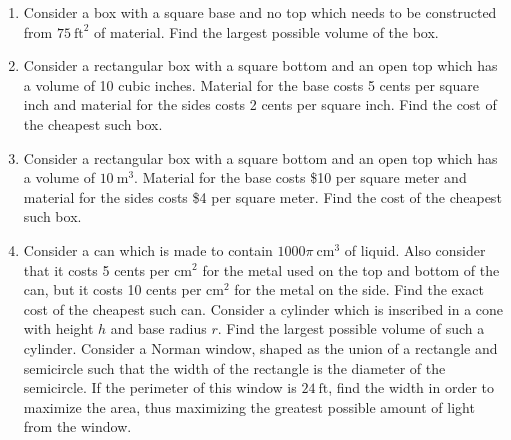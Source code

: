 \documentclass{book}
\begin{document}
\begin{enumerate}[!HW!]
\itemspade Consider an open box with a square base and a volume of $4000\ \text{cm}^3$. Find the minimum surface area of the box, thus minimizing cost of construction.
\itemspade Consider an open box which has a volume of $10\ \text{m}^3$. The length of this base is twice
the width. Material for the base costs $5/ \text{m}^2$, but material for the sides costs $3/\text{m}^2$. Find the minimum cost of constructing such a box.
\item Consider a box with a square base and no top which needs to be constructed from $75\ \text{ft}^2$ of material. Find the largest possible volume of the box. 
\item Consider a rectangular box with a square bottom and an open top which has a volume of 10 cubic inches. Material for the base costs 5 cents per square inch and material for the sides costs 2 cents per square inch. Find the cost of the cheapest such box. 
\item Consider a rectangular box with a square bottom and an open top which has a volume of $10\ \text{m}^3$. Material for the base costs \$10 per square meter and material for the sides costs \$4  per square meter. Find the cost of the cheapest such box. 
\item Consider a can which is made to contain $1000\pi\ \text{cm}^3$ of liquid. Also consider that it costs 5 cents per $\text{cm}^2$ for the metal used on the top and bottom of the can, but it costs 10 cents per $\text{cm}^2$ for the metal on the side. Find the exact cost of the cheapest such can.
\itemspade Consider a cylinder which is inscribed in a cone with height $h$ and base radius $r$. Find the largest possible volume of such a cylinder.
\itemspade Consider a Norman window, shaped as the union of a rectangle and semicircle such that the width of the rectangle is the diameter of the semicircle. If the perimeter of this window is $24\ \text{ft}$, find the width in order to maximize the area, thus maximizing the greatest possible amount of light from the window. 
\end{enumerate}
\end{document}
